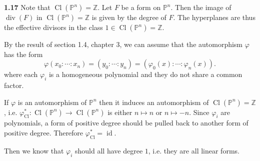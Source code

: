 \documentclass{article}
\makeatletter
\newcommand*{\shifttext}[1]{%
  \settowidth{\@tempdima}{#1}%
  \hspace{-\@tempdima}#1%
}
\newcommand{\plabel}[1]{%
\shifttext{\textbf{#1}\quad}%
}
\makeatother
\begin{document}
\plabel{1.17}%
Note that $\operatorname{Cl}(\mathbb{P}^n) = \mathbb{Z}$.
Let $F$ be a form on $\mathbb{P}^n$.
Then the image of $\operatorname{div}(F)$ in $\operatorname{Cl}(\mathbb{P}^n) = \mathbb{Z}$ is given by the degree of $F$.
The hyperplanes are thus the effective divisors in the class $1\in \operatorname{Cl}(\mathbb{P}^n) = \mathbb{Z}$.
\par
By the result of section 1.4, chapter 3, we can assume that the automorphism $\varphi$ has the form 
\[ \varphi(x_0:\cdots:x_n) = (y_0:\cdots:y_n) = (\varphi_0(x):\cdots:\varphi_n(x)). \]
where each $\varphi_i$ is a homogeneous polynomial and they do not share a common factor.
\par
If $\varphi$ is an automorphism of $\mathbb{P}^n$ then it induces an automorphism of $\operatorname{Cl}(\mathbb{P}^n) = \mathbb{Z}$, i.e. $\varphi_{\operatorname{Cl}}^*\colon\operatorname{Cl}(\mathbb{P}^n)\to\operatorname{Cl}(\mathbb{P}^n)$ is either $n\mapsto n$ or $n\mapsto -n$.
Since $\varphi_i$ are polynomials, a form of positive degree should be pulled back to another form of positive degree.
Therefore $\varphi_{\operatorname{Cl}}^* = \operatorname{id}$.
\par
Then we know that $\varphi_i$ should all have degree $1$, i.e. they are all linear forms.

\end{document}
